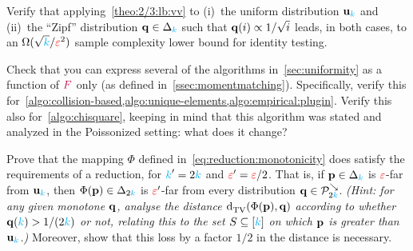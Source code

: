 \begin{question}\label{ex:2/3:lb:applications}
Verify that applying~\cref{theo:2/3:lb:vv} to (i)~the uniform distribution $\mathbf{u}_{\textcolor{cyan}{k}}$ and (ii)~the ``Zipf'' distribution $\mathbf{q}\in\Delta_{{\textcolor{cyan}{k}}}$ such that $\mathbf{q}(i) \propto 1/\sqrt{i}$ leads, in both cases, to an $\Omega(\sqrt{{\textcolor{cyan}{k}}}/\textcolor{red}{\varepsilon}^2)$ sample complexity lower bound for identity testing.
\end{question}

\begin{question}\label{exo:reexpress:algos:frequency:only}
Check that you can express several of the algorithms in~\cref{sec:uniformity} as a function of $\textcolor{purple}{F}$ only (as defined in~\cref{ssec:momentmatching}). Specifically, verify this for~\cref{algo:collision-based,algo:unique-elements,algo:empirical:plugin}. Verify this also for~\cref{algo:chisquare}, keeping in mind that this algorithm was stated and analyzed in the Poissonized setting: what does it change?
\end{question}
\begin{question}[$\star$]\label{ex:reduction:monotone}
  Prove that the mapping $\Phi$ defined in~\cref{eq:reduction:monotonicity} does satisfy the requirements of a reduction, for ${\textcolor{cyan}{k}}'=2{\textcolor{cyan}{k}}$ and $\textcolor{red}{\varepsilon}'=\textcolor{red}{\varepsilon}/2$. That is, if $\mathbf{p}\in\Delta_{{\textcolor{cyan}{k}}}$ is $\textcolor{red}{\varepsilon}$-far from $\mathbf{u}_{\textcolor{cyan}{k}}$, then $\Phi(\mathbf{p})\in\Delta_{2{\textcolor{cyan}{k}}}$ is $\textcolor{red}{\varepsilon}'$-far from every distribution $\mathbf{q}\in\mathcal{P}^{\searrow}_{2{\textcolor{cyan}{k}}}$. \textit{(Hint: for any given monotone $\mathbf{q}$, analyse the distance $\totalvardist{\Phi(\p)}{\q}$ according to whether $\mathbf{q}({\textcolor{cyan}{k}}) > 1/(2{\textcolor{cyan}{k}})$ or not, relating this to the set $S\subseteq[{\textcolor{cyan}{k}}]$ on which $\mathbf{p}$ is greater than $\mathbf{u}_{\textcolor{cyan}{k}}$.)} Moreover, show that this loss by a factor $1/2$ in the distance is necessary.
\end{question}
\iffalse %
